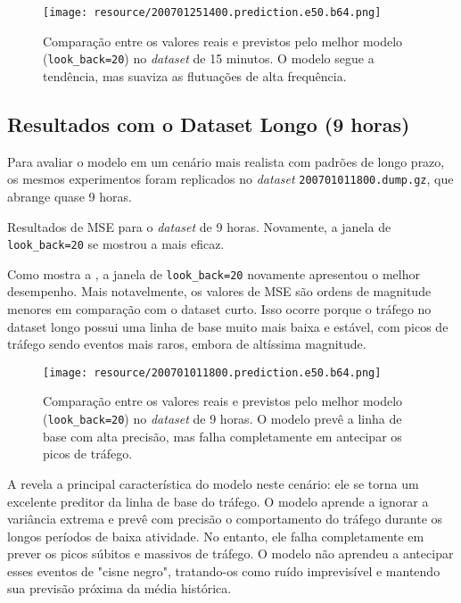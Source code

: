 \begin{figure}[!htb]
    \centering
    \texttt{[image: resource/200701251400.prediction.e50.b64.png]}
    \caption{Comparação entre os valores reais e previstos pelo melhor modelo (\texttt{look\_back=20}) no
    \emph{dataset} de 15 minutos. O modelo segue a tendência, mas suaviza as flutuações de alta frequência.}
    \label{fig:modeling-prediction-short}
\end{figure}

\FloatBarrier
\subsection{Resultados com o Dataset Longo (9 horas)}

Para avaliar o modelo em um cenário mais realista com padrões de longo prazo, os mesmos experimentos foram
replicados no \emph{dataset} \texttt{200701011800.dump.gz}, que abrange quase 9 horas.

\begin{table}[!htb]
    \centering
    \caption{Resultados de MSE para o \emph{dataset} de 9 horas. Novamente, a janela de
    \texttt{look\_back=20} se mostrou a mais eficaz.}
    \label{tab:modeling-mse-long}
    
\end{table}

Como mostra a , a janela de \texttt{look\_back=20} novamente apresentou o melhor
desempenho. Mais notavelmente, os valores de MSE são ordens de magnitude menores em comparação com o dataset
curto. Isso ocorre porque o tráfego no dataset longo possui uma linha de base muito mais baixa e estável, com
picos de tráfego sendo eventos mais raros, embora de altíssima magnitude.

\begin{figure}[!htb]
    \centering
    \texttt{[image: resource/200701011800.prediction.e50.b64.png]}
    \caption{Comparação entre os valores reais e previstos pelo melhor modelo (\texttt{look\_back=20}) no
        \emph{dataset} de 9 horas. O modelo prevê a linha de base com alta precisão, mas falha completamente em
    antecipar os picos de tráfego.}
    \label{fig:modeling-prediction-long}
\end{figure}

A  revela a principal característica do modelo neste cenário: ele se torna
um excelente preditor da linha de base do tráfego. O modelo aprende a ignorar a variância extrema e prevê com
precisão o comportamento do tráfego durante os longos períodos de baixa atividade. No entanto, ele falha
completamente em prever os picos súbitos e massivos de tráfego. O modelo não aprendeu a antecipar esses
eventos de "cisne negro", tratando-os como ruído imprevisível e mantendo sua previsão próxima da média histórica.

